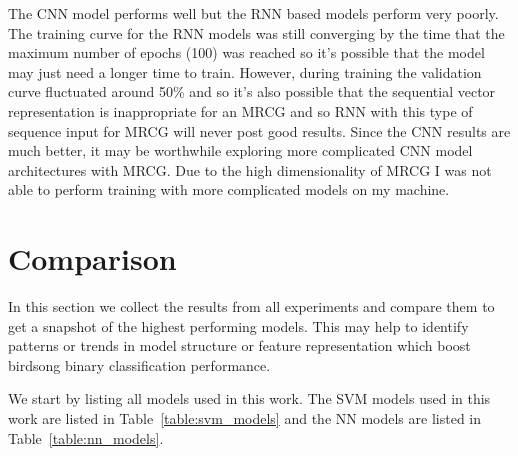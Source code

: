 The CNN model performs well but the RNN based models perform very poorly. The
training curve for the RNN models was still converging by the time that the
maximum number of epochs (100) was reached so it's possible that the model may
just need a longer time to train. However, during training the validation curve
fluctuated around 50\% and so it's also possible that the sequential vector
representation is inappropriate for an MRCG and so RNN with this type of
sequence input for MRCG will never post good results. Since the CNN results are
much better, it may be worthwhile exploring more complicated CNN model
architectures with MRCG\@. Due to the high dimensionality of MRCG I was not able
to perform training with more complicated models on my machine.

\section{Comparison}

In this section we collect the results from all experiments and compare them to
get a snapshot of the highest performing models. This may help to identify
patterns or trends in model structure or feature representation which boost
birdsong binary classification performance.

We start by listing all models used in this work. The SVM models used in this
work are listed in Table~\ref{table:svm_models} and the NN models are listed in
Table~\ref{table:nn_models}.

